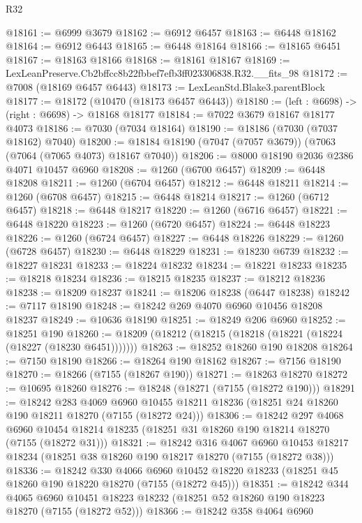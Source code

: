 \begin{lexlean}{R32}
\begin{coremodule}
@18161 := @6999 @3679
@18162 := @6912 @6457
@18163 := @6448 @18162
@18164 := @6912 @6443
@18165 := @6448 @18164
@18166 := @18165 @6451
@18167 := @18163 @18166
@18168 := @18161 @18167
@18169 := LexLeanPreserve.Cb2bffcc8b22fbbef7efb3ff023306838.R32.__fits_98
@18172 := @7008 (@18169 @6457 @6443)
@18173 := LexLeanStd.Blake3.parentBlock
@18177 := @18172 (@10470 (@18173 @6457 @6443))
@18180 := (left : @6698) -> (right : @6698) -> @18168 @18177
@18184 := @7022 @3679 @18167 @18177 @4073
@18186 := @7030 (@7034 @18164)
@18190 := @18186 (@7030 (@7037 @18162) @7040)
@18200 := @18184 @18190 (@7047 (@7057 @3679)) (@7063 (@7064 (@7065 @4073) @18167 @7040))
@18206 := @8000 @18190 @2036 @2386 @4071 @10457 @6960
@18208 := @1260 (@6700 @6457)
@18209 := @6448 @18208
@18211 := @1260 (@6704 @6457)
@18212 := @6448 @18211
@18214 := @1260 (@6708 @6457)
@18215 := @6448 @18214
@18217 := @1260 (@6712 @6457)
@18218 := @6448 @18217
@18220 := @1260 (@6716 @6457)
@18221 := @6448 @18220
@18223 := @1260 (@6720 @6457)
@18224 := @6448 @18223
@18226 := @1260 (@6724 @6457)
@18227 := @6448 @18226
@18229 := @1260 (@6728 @6457)
@18230 := @6448 @18229
@18231 := @18230 @6739
@18232 := @18227 @18231
@18233 := @18224 @18232
@18234 := @18221 @18233
@18235 := @18218 @18234
@18236 := @18215 @18235
@18237 := @18212 @18236
@18238 := @18209 @18237
@18241 := @18206 @18238 (@6447 @18238)
@18242 := @7117 @18190
@18248 := @18242 @269 @4070 @6960 @10456 @18208 @18237
@18249 := @10636 @18190
@18251 := @18249 @206 @6960
@18252 := @18251 @190
@18260 := @18209 (@18212 (@18215 (@18218 (@18221 (@18224 (@18227 (@18230 @6451)))))))
@18263 := @18252 @18260 @190 @18208
@18264 := @7150 @18190
@18266 := @18264 @190 @18162
@18267 := @7156 @18190
@18270 := @18266 (@7155 (@18267 @190))
@18271 := @18263 @18270
@18272 := @10695 @18260
@18276 := @18248 (@18271 (@7155 (@18272 @190)))
@18291 := @18242
    @283
    @4069
    @6960
    @10455
    @18211
    @18236
    (@18251 @24 @18260 @190 @18211 @18270 (@7155 (@18272 @24)))
@18306 := @18242
    @297
    @4068
    @6960
    @10454
    @18214
    @18235
    (@18251 @31 @18260 @190 @18214 @18270 (@7155 (@18272 @31)))
@18321 := @18242
    @316
    @4067
    @6960
    @10453
    @18217
    @18234
    (@18251 @38 @18260 @190 @18217 @18270 (@7155 (@18272 @38)))
@18336 := @18242
    @330
    @4066
    @6960
    @10452
    @18220
    @18233
    (@18251 @45 @18260 @190 @18220 @18270 (@7155 (@18272 @45)))
@18351 := @18242
    @344
    @4065
    @6960
    @10451
    @18223
    @18232
    (@18251 @52 @18260 @190 @18223 @18270 (@7155 (@18272 @52)))
@18366 := @18242
    @358
    @4064
    @6960

\end{coremodule}
\end{lexlean}
